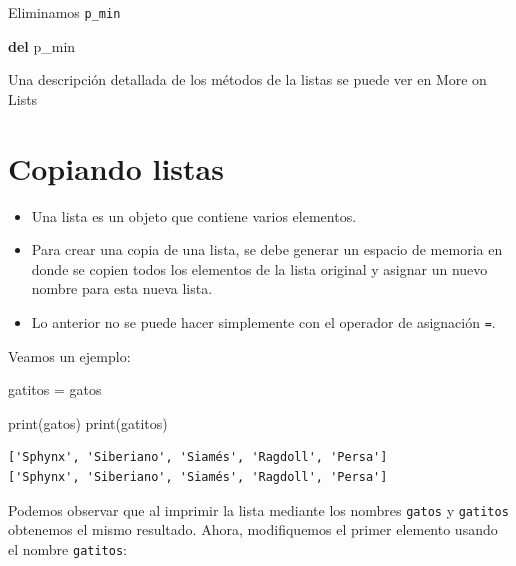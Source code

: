 \documentclass[
  spanish,
  letterpaper,
]{scrbook}
\newenvironment{Shaded}{\begin{snugshade}}{\end{snugshade}}
\newcommand{\BuiltInTok}[1]{\textcolor[rgb]{0.00,0.23,0.31}{#1}}
\newcommand{\KeywordTok}[1]{\textcolor[rgb]{0.00,0.23,0.31}{\textbf{#1}}}
\newcommand{\NormalTok}[1]{\textcolor[rgb]{0.00,0.23,0.31}{#1}}
\newcommand{\OperatorTok}[1]{\textcolor[rgb]{0.37,0.37,0.37}{#1}}
\providecommand{\tightlist}{%
  \setlength{\itemsep}{0pt}\setlength{\parskip}{0pt}}
\theoremstyle{definition}
\theoremstyle{remark}
\begin{document}
Eliminamos \texttt{p\_min}

\begin{Shaded}
\begin{Highlighting}[]
\KeywordTok{del}\NormalTok{ p\_min}
\end{Highlighting}
\end{Shaded}

Una descripción detallada de los métodos de la listas se puede ver en
More on Lists

\section{Copiando listas}\label{copiando-listas}

\begin{itemize}
\tightlist
\item
  Una lista es un objeto que contiene varios elementos.
\item
  Para crear una copia de una lista, se debe generar un espacio de
  memoria en donde se copien todos los elementos de la lista original y
  asignar un nuevo nombre para esta nueva lista.
\item
  Lo anterior no se puede hacer simplemente con el operador de
  asignación \texttt{=}.
\end{itemize}

Veamos un ejemplo:

\begin{Shaded}
\begin{Highlighting}[]
\NormalTok{gatitos }\OperatorTok{=}\NormalTok{ gatos}
\end{Highlighting}
\end{Shaded}

\begin{Shaded}
\begin{Highlighting}[]
\BuiltInTok{print}\NormalTok{(gatos)}
\BuiltInTok{print}\NormalTok{(gatitos)}
\end{Highlighting}
\end{Shaded}

\begin{verbatim}
['Sphynx', 'Siberiano', 'Siamés', 'Ragdoll', 'Persa']
['Sphynx', 'Siberiano', 'Siamés', 'Ragdoll', 'Persa']
\end{verbatim}

Podemos observar que al imprimir la lista mediante los nombres
\texttt{gatos} y \texttt{gatitos} obtenemos el mismo resultado. Ahora,
modifiquemos el primer elemento usando el nombre \texttt{gatitos}:
\end{document}
